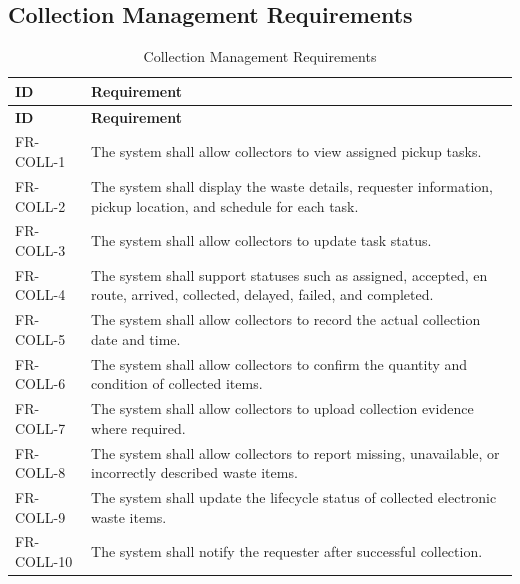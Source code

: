 \subsection{Collection Management Requirements}
\begin{longtable}{@{}p{2.4cm}p{11cm}@{}}
\caption{Collection Management Requirements} \label{tab:fr-coll} \\
\toprule \textbf{ID} & \textbf{Requirement} \\ \midrule
\endfirsthead
\toprule \textbf{ID} & \textbf{Requirement} \\ \midrule
\endhead
FR-COLL-1 & The system shall allow collectors to view assigned pickup tasks. \\
FR-COLL-2 & The system shall display the waste details, requester information, pickup location, and schedule for each task. \\
FR-COLL-3 & The system shall allow collectors to update task status. \\
FR-COLL-4 & The system shall support statuses such as assigned, accepted, en route, arrived, collected, delayed, failed, and completed. \\
FR-COLL-5 & The system shall allow collectors to record the actual collection date and time. \\
FR-COLL-6 & The system shall allow collectors to confirm the quantity and condition of collected items. \\
FR-COLL-7 & The system shall allow collectors to upload collection evidence where required. \\
FR-COLL-8 & The system shall allow collectors to report missing, unavailable, or incorrectly described waste items. \\
FR-COLL-9 & The system shall update the lifecycle status of collected electronic waste items. \\
FR-COLL-10 & The system shall notify the requester after successful collection. \\
\bottomrule
\end{longtable}

